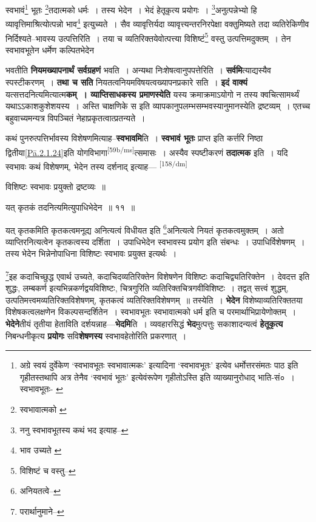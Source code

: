 \documentclass[article,12pt,a4paper]{memoir}
\begin{document}
	  \pstart स्वभावं\footnote{अग्रे स्वयं दुर्वेकेण ‘स्वभावभूतः स्वभावात्मकः’ इत्यादिना ‘स्वभावभूतः’ इत्येव धर्मोत्तरसंमतः पाठ इति गृहीतस्तथापि अत्र तेनैव ‘स्वभावं भूतः’ इत्येवंरूपेण गृहीतोऽस्ति इति व्याख्यानुरोधाद् भाति-सं० । स्वभावभूतः-\cite{dp-msA} \cite{dp-msB} \cite{dp-msC} \cite{dp-msD} \cite{dp-edP} \cite{dp-edH} \cite{dp-edE} \cite{dp-edN}} भूतः \footnote{स्वभावात्मको \cite{dp-msA} \cite{dp-msB} \cite{dp-msC} \cite{dp-msD} \cite{dp-edP} \cite{dp-edH} \cite{dp-edE} \cite{dp-edN}}तदात्मको धर्मः । तस्य भेदेन । भेदं हेतूकृत्य प्रयोगः । \footnote{ननु स्वभावभूतस्य कथं भद इत्याह--\cite{dp-msD-n}}अनुत्पन्नेभ्यो हि व्यावृत्तिमाश्रित्योत्पन्नो भाव\footnote{भाव उच्यते \cite{dp-msA} \cite{dp-msB} \cite{dp-msD} \cite{dp-edP} \cite{dp-edH} \cite{dp-edE} \cite{dp-edN}} इत्युच्यते । सैव व्यावृत्तिर्यदा व्यावृत्त्यन्तरनिरपेक्षा वक्तुमिष्यते तदा व्यतिरेकिणीव निर्दिश्यते--भावस्य उत्पत्तिरिति । तया च व्यतिरिक्तयेवोत्पत्त्या विशिष्टं\footnote{विशिष्टं च वस्तु--\cite{dp-msC}} वस्तु उत्पत्तिमदुक्तम् । तेन स्वभावभूतेन धर्मेण कल्पितभेदेन
	\pend
      

	  \pstart भवतीति \textbf{नियमख्यापनार्थं सर्वग्रहणं} भवति । अन्यथा निःशेषत्वानुपपत्तेरिति । \textbf{सर्वमि}त्याद्यस्यैव स्पस्टीकरणम् । \textbf{तथा च सति} नियतत्वनियमविषयत्वख्यापनप्रकारे सति । \textbf{इदं वाक्यं} यत्सत्तदनित्यमित्यात्म\textbf{कम् । व्याप्तिसाधकस्य प्रमाणस्येति} यस्य क्रमाक्रमाऽयोगो न तस्य क्वचित्सामर्थ्यं यथाऽऽकाशकुशेशयस्य । अस्ति चाक्षणिके स इति व्यापकानुपलम्भसम्भवस्यानुमानस्येति द्रष्टव्यम् । एतच्च बहुवाच्यमन्यत्र विपञ्चितं नेहाप्रकृतत्वात्प्रतन्यते ।
	\pend
      

	  \pstart कथं पुनरुत्पत्तिर्भावस्य विशेषणमित्याह--\textbf{स्वभावमि}ति । \textbf{स्वभावं भूतः} प्राप्त इति कर्त्तरि निष्ठा द्वितीया\cref{Pā.2.1.24}इति योगविभागा\leavevmode\textsuperscript{\rmlatinfont\tiny [59b/ms]}त्समासः । अस्यैव स्पष्टीकरणं \textbf{तदात्मक} इति । यदि स्वभावः कथं विशेषणम्, भेदेन तस्य दर्शनाद् इत्याह—  \leavevmode\textsuperscript{\rmlatinfont\tiny [158/dm]} 
	  
	विशिष्टः स्वभावः प्रयुक्तो द्रष्टव्यः ॥ 
	  
	यत् कृतकं तदनित्यमित्युपाधिभेदेन ॥ ११ ॥ 
	  
	यत् कृतकमिति कृतकत्वमनूद्य अनित्यत्वं विधीयत इति \footnote{अनियतत्वे--\cite{dp-msA}}अनित्यत्वे नियतं कृतकत्वमुक्तम् । अतो व्याप्तिरनित्यत्वेन कृतकत्वस्य दर्शिता । उपाधिभेदेन स्वभावस्य प्रयोग इति संबन्धः । उपाधिर्विशेषणम् । तस्य भेदेन भिन्नेनोपाधिना विशिष्टः स्वभावः प्रयुक्त इत्यर्थः । 
	  
	\footnote{परार्थानुमाने--\cite{dp-msD-n}}इह कदाचिच्छुद्ध एवार्थ उच्यते, कदाचिदव्यतिरिक्तेन विशेषणेन विशिष्टः कदाचिद्व्यतिरिक्तेन । देवदत्त इति शुद्धः, लम्बकर्ण इत्यभिन्नकर्णद्वयविशिष्टः, चित्रगुरिति व्यतिरिक्तचित्रगवीविशिष्टः । तद्वत् सत्त्वं शुद्धम्, उत्पतिमत्त्वमव्यतिरिक्तविशेषणम्, कृतकत्वं व्यतिरिक्तविशेषणम् ॥ तस्येति । \textbf{भेदेन} विशेष्याव्यतिरिक्ततया विशेषकत्वलक्षणेन विकल्पसन्दर्शितेन । स्वभावभूतः स्वभावात्मको धर्म इति च परमार्थाभिप्रायेणोक्तम् । \textbf{भेदेने}तीयं तृतीया हेताविति दर्शयन्नाह—\textbf{भेदमि}ति । व्यवहारसिद्धं \textbf{भेद}मुत्पत्तुः सकाशादन्यत्वं \textbf{हेतूकृत्य} निबन्धनीकृत्य \textbf{प्रयोगः} सवि\textbf{शेषणस्य} स्वभावहेतोरिति प्रकरणात् ।
	\pend
      
\end{document}
